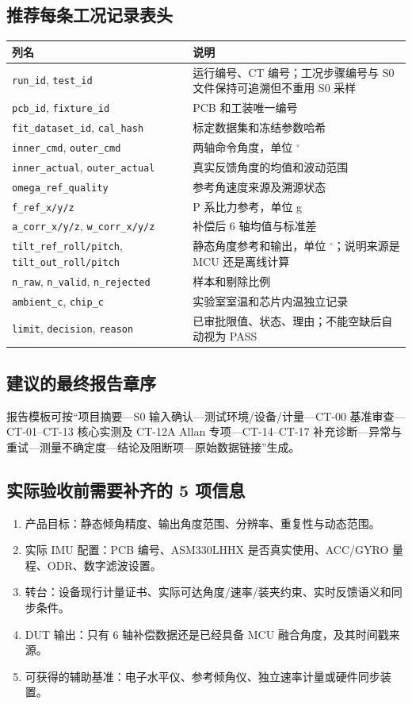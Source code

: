 \subsection{推荐每条工况记录表头}
\begin{longtable}{p{36mm}p{108mm}}
\toprule
列名 & 说明\\\midrule\endhead
\texttt{run\_id}, \texttt{test\_id} & 运行编号、CT 编号；工况步骤编号与 S0 文件保持可追溯但不重用 S0 采样\\
\texttt{pcb\_id}, \texttt{fixture\_id} & PCB 和工装唯一编号\\
\texttt{fit\_dataset\_id}, \texttt{cal\_hash} & 标定数据集和冻结参数哈希\\
\texttt{inner\_cmd}, \texttt{outer\_cmd} & 两轴命令角度，单位 $^\circ$\\
\texttt{inner\_actual}, \texttt{outer\_actual} & 真实反馈角度的均值和波动范围\\
\texttt{omega\_ref\_quality} & 参考角速度来源及溯源状态\\
\texttt{f\_ref\_x/y/z} & P 系比力参考，单位 g\\
\texttt{a\_corr\_x/y/z}, \texttt{w\_corr\_x/y/z} & 补偿后 6 轴均值与标准差\\
\texttt{tilt\_ref\_}\allowbreak\texttt{roll/pitch}, \texttt{tilt\_out\_}\allowbreak\texttt{roll/pitch} & 静态角度参考和输出，单位 $^\circ$；说明来源是 MCU 还是离线计算\\
\texttt{n\_raw}, \texttt{n\_valid}, \texttt{n\_rejected} & 样本和剔除比例\\
\texttt{ambient\_c}, \texttt{chip\_c} & 实验室室温和芯片内温独立记录\\
\texttt{limit}, \texttt{decision}, \texttt{reason} & 已审批限值、状态、理由；不能空缺后自动视为 PASS\\\bottomrule
\end{longtable}
\subsection{建议的最终报告章序}
报告模板可按“项目摘要—S0 输入确认—测试环境/设备/计量—CT-00 基准审查—CT-01--CT-13 核心实测及 CT-12A Allan 专项—CT-14--CT-17 补充诊断—异常与重试—测量不确定度—结论及阻断项—原始数据链接”生成。
\subsection{实际验收前需要补齐的 5 项信息}
\begin{enumerate}
\item 产品目标：静态倾角精度、输出角度范围、分辨率、重复性与动态范围。
\item 实际 IMU 配置：PCB 编号、ASM330LHHX 是否真实使用、ACC/GYRO 量程、ODR、数字滤波设置。
\item 转台：设备现行计量证书、实际可达角度/速率/装夹约束、实时反馈语义和同步条件。
\item DUT 输出：只有 6 轴补偿数据还是已经具备 MCU 融合角度，及其时间戳来源。
\item 可获得的辅助基准：电子水平仪、参考倾角仪、独立速率计量或硬件同步装置。
\end{enumerate}
